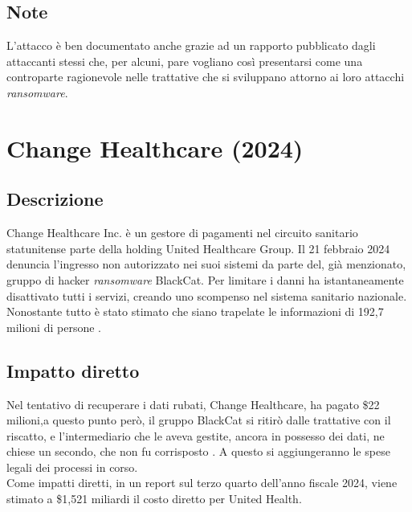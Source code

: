 \documentclass[12pt,a4paper,twoside]{report}
\begin{document}
\subsection{Note}
L'attacco \`e ben documentato anche grazie ad un rapporto pubblicato dagli attaccanti stessi che, per alcuni, pare vogliano cos\`i presentarsi come una controparte ragionevole nelle trattative che si sviluppano attorno ai loro attacchi \textit{ransomware}.\\
\section{Change Healthcare (2024)}\label{sect:ChangeH}
\subsection{Descrizione}
Change Healthcare Inc. \`e un gestore di pagamenti nel circuito sanitario statunitense parte della holding United Healthcare Group. Il 21 febbraio 2024 denuncia l'ingresso non autorizzato nei suoi sistemi da parte del, gi\`a menzionato, gruppo di hacker \textit{ransomware}  BlackCat. Per limitare i danni ha istantaneamente disattivato tutti i servizi, creando uno scompenso nel sistema sanitario nazionale. Nonostante tutto \`e stato stimato che siano trapelate le informazioni di 192,7 milioni di persone \cite{ChHealth_hipaa} \cite{ChHealth_lessons}.\\
\subsection{Impatto diretto}
Nel tentativo di recuperare i dati rubati, Change Healthcare, ha pagato \$22 milioni,a questo punto per\`o, il gruppo BlackCat si ritir\`o dalle trattative con il riscatto, e l'intermediario che le aveva gestite, ancora in possesso dei dati, ne chiese un secondo, che non fu corrisposto \cite{ChHealth_hipaa}. 
A questo si aggiungeranno le spese legali dei processi in corso. \\
Come impatti diretti, in un report sul terzo quarto dell'anno fiscale 2024, viene stimato a \$1,521 miliardi il costo diretto per United Health.\\
\end{document}
